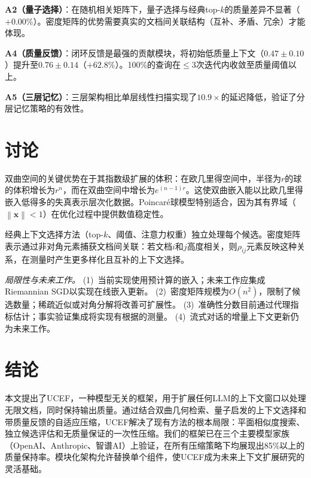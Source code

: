 \documentclass[a4paper,11pt]{ctexart}
\newcommand{\norm}[1]{\left\|#1\right\|}
\newcommand{\ucef}{\textsf{UCEF}}
\begin{document}
\textbf{A2（量子选择）}：在随机相关矩阵下，量子选择与经典top-$k$的质量差异不显著（$+0.00\%$）。密度矩阵的优势需要真实的文档间关联结构（互补、矛盾、冗余）才能体现。

\textbf{A4（质量反馈）}：闭环反馈是最强的贡献模块，将初始低质量上下文（$0.47\pm0.10$）提升至$0.76\pm0.14$（$+62.8\%$）。100\%的查询在$\leq 3$次迭代内收敛至质量阈值以上。

\textbf{A5（三层记忆）}：三层架构相比单层线性扫描实现了$10.9\times$的延迟降低，验证了分层记忆策略的有效性。


\section{讨论}
\label{sec:discussion}

双曲空间的关键优势在于其指数级扩展的体积：在欧几里得空间中，半径为$r$的球的体积增长为$r^{n}$，而在双曲空间中增长为$e^{(n-1)r}$。这使双曲嵌入能以比欧几里得嵌入低得多的失真表示层次化数据。Poincar\'{e}球模型特别适合，因为其有界域（$\norm{\mathbf{x}} < 1$）在优化过程中提供数值稳定性。

经典上下文选择方法（top-$k$、阈值、注意力权重）独立处理每个候选。密度矩阵表示通过非对角元素捕获文档间关联：若文档$i$和$j$高度相关，则$\rho_{ij}$元素反映这种关系，在测量时产生更多样化且互补的上下文选择。

\emph{局限性与未来工作。}
(1)~当前实现使用预计算的嵌入；未来工作应集成Riemannian SGD以实现在线嵌入更新。
(2)~密度矩阵规模为$O(n^{2})$，限制了候选数量；稀疏近似或对角分解将改善可扩展性。
(3)~准确性分数目前通过代理指标估计；事实验证集成将实现有根据的测量。
(4)~流式对话的增量上下文更新仍为未来工作。


\section{结论}
\label{sec:conclusion}

本文提出了\ucef{}，一种模型无关的框架，用于扩展任何LLM的上下文窗口以处理无限文档，同时保持输出质量。通过结合双曲几何检索、量子启发的上下文选择和带质量反馈的自适应压缩，\ucef{}解决了现有方法的根本局限：平面相似度搜索、独立候选评估和无质量保证的一次性压缩。我们的框架已在三个主要模型家族（OpenAI、Anthropic、智谱AI）上验证，在所有压缩策略下均展现出85\%以上的质量保持率。模块化架构允许替换单个组件，使\ucef{}成为未来上下文扩展研究的灵活基础。
\end{document}
